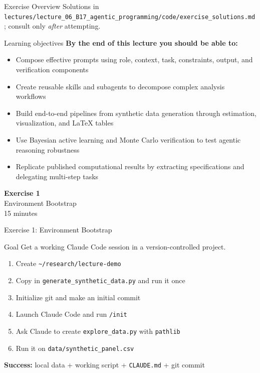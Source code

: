 \documentclass[aspectratio=169,10pt]{beamer}
\begin{document}
\begin{frame}{Exercise Overview}
\vspace{0.2em}
{\tiny Solutions in \texttt{lectures/lecture\_06\_B17\_agentic\_programming/code/exercise\_solutions.md}; consult only \emph{after} attempting.}
\end{frame}

\begin{frame}{Learning objectives}
\textbf{By the end of this lecture you should be able to:}
\begin{itemize}
  \item Compose effective prompts using role, context, task, constraints, output, and verification components
  \item Create reusable skills and subagents to decompose complex analysis workflows
  \item Build end-to-end pipelines from synthetic data generation through estimation, visualization, and LaTeX tables
  \item Use Bayesian active learning and Monte Carlo verification to test agentic reasoning robustness
  \item Replicate published computational results by extracting specifications and delegating multi-step tasks
\end{itemize}
\end{frame}


\begin{frame}{}
\vfill\begin{center}{\Huge \textcolor{uzhblue}{\textbf{Exercise 1}}}\\[12pt]
{\LARGE Environment Bootstrap}\\[6pt]{\small 15 minutes}\end{center}\vfill
\end{frame}

\begin{frame}[fragile]{Exercise 1: Environment Bootstrap}
\begin{exampleblock}{Goal}
Get a working Claude Code session in a version-controlled project.
\end{exampleblock}
\small
\begin{enumerate}\itemsep1pt
    \item Create \texttt{\~{}/research/lecture-demo}
    \item Copy in \texttt{generate\_synthetic\_data.py} and run it once
    \item Initialize git and make an initial commit
    \item Launch Claude Code and run \texttt{/init}
    \item Ask Claude to create \texttt{explore\_data.py} with \texttt{pathlib}
    \item Run it on \texttt{data/synthetic\_panel.csv}
\end{enumerate}

\textbf{Success:} local data + working script + \texttt{CLAUDE.md} + git commit
\end{frame}
\end{document}
